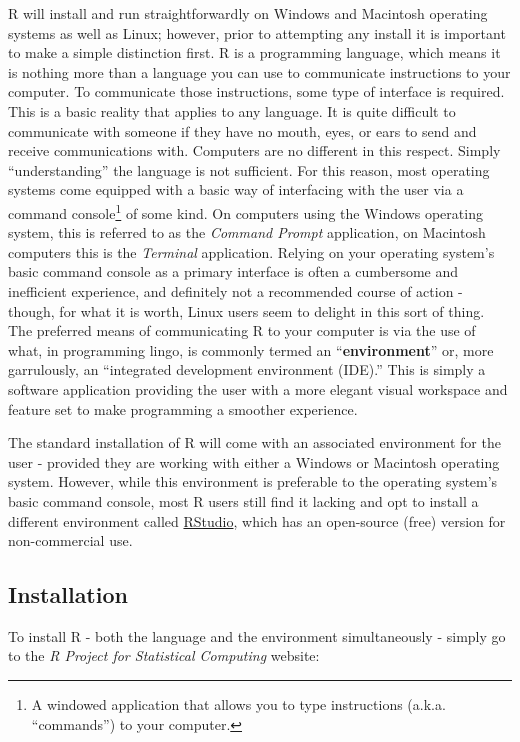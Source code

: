 R will install and run straightforwardly on Windows and Macintosh operating systems as well as Linux; however, prior to attempting any install it is important to make a simple distinction first.  R is a programming language, which means it is nothing more than a language you can use to communicate instructions to your computer. To communicate those instructions, some type of interface is required.  This is a basic reality that applies to any language.  It is quite difficult to communicate with someone if they have no mouth, eyes, or ears to send and receive communications with. Computers are no different in this respect. Simply ``understanding'' the language is not sufficient.  For this reason, most operating systems come equipped with a basic way of interfacing with the user via a \gls{command console}\footnote{A windowed application that allows you to type instructions (a.k.a. ``commands'') to your computer.} of some kind. On computers using the Windows operating system, this is referred to as the \textit{Command Prompt} application, on Macintosh computers this is the \textit{Terminal} application. Relying on your operating system's basic command console as a primary interface is often a cumbersome and inefficient experience, and definitely not a recommended course of action - though, for what it is worth, Linux users seem to delight in this sort of thing. The preferred means of communicating R to your computer is via the use of what, in programming lingo, is commonly termed an ``\textbf{environment}'' or, more garrulously, an ``\gls{integrated development environment} (\acrshort{IDE}).''  This is simply a software application providing the user with a more elegant visual workspace and feature set to make programming a smoother experience. 

The standard installation of R will come with an associated environment for the user - provided they are working with either a Windows or Macintosh operating system.  However, while this environment is preferable to the operating system's basic command console, most R users still find it lacking and opt to install a different environment called \href{https://posit.co/}{\gls{RStudio}}, which has an open-source (free) version for non-commercial use.

\subsection{Installation}
\label{sec:install}

To install R - both the language and the environment simultaneously - simply go to the \textit{R Project for Statistical Computing} website: 


